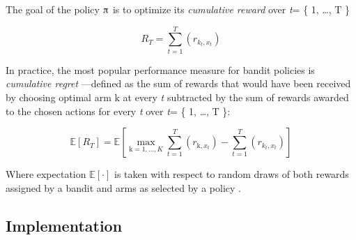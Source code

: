 \documentclass{jss}
\begin{document}
The goal of the policy $\piup$ is to optimize its \textit{cumulative reward} over \emph{t}= \{ 1, \ldots, T \}

\begin{equation} \label{eq:1}
R_{T} = \sum^{T}_{t=1}(r_{k_t,x_t})
\end{equation}

In practice, the most popular performance measure for bandit policies is \textit{cumulative regret} \citep{Kuleshov2014}---defined as the sum of rewards that would have been received by choosing optimal arm $\mathrm{k}$ at every \emph{t} subtracted by the sum of rewards awarded to the chosen actions for every \emph{t} over \emph{t}= \{ 1, \ldots, T \}:

\begin{equation} \label{eq:2}
\mathbb{E}\left[R_{T} \right] = \mathbb{E}\left[  \max_{\mathrm{k} = 1, \dots, K} \sum^{T}_{t=1}(r_{\mathrm{k},x_t}) - \sum^{T}_{t=1}(r_{k_t,x_t})\right]
\end{equation}

Where expectation $\mathbb{E}\left[ \mathord{\cdot}\right]$ is taken with respect to random draws of both rewards assigned by a bandit and arms as selected by a policy \citep{Zheng2016a}.

\subsection{Implementation} \label{implementation}
\end{document}
